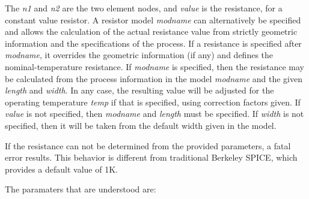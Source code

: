 
The {\it n1} and {\it n2} are the two element nodes, and {\it value}
is the resistance, for a constant value resistor.  A resistor model
{\it modname} can alternatively be specified and allows the
calculation of the actual resistance value from strictly geometric
information and the specifications of the process.  If a resistance is
specified after {\it modname}, it overrides the geometric information
(if any) and defines the nominal-temperature resistance.  If {\it
modname} is specified, then the resistance may be calculated from the
process information in the model {\it modname} and the given {\it
length} and {\it width}.  In any case, the resulting value will be
adjusted for the operating temperature {\it temp} if that is
specified, using correction factors given.  If {\it value} is not
specified, then {\it modname} and {\it length} must be specified.  If
{\it width} is not specified, then it will be taken from the default
width given in the model.

If the resistance can not be determined from the provided parameters,
a fatal error results.  This behavior is different from traditional
Berkeley SPICE, which provides a default value of 1K.

The paramaters that are understood are:

